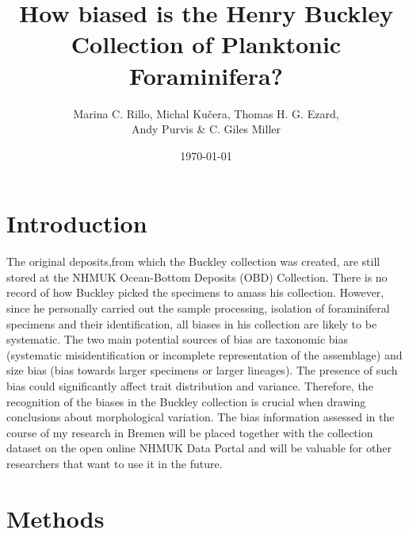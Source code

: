 \documentclass[a4paper]{article}
\title{How biased is the Henry Buckley Collection of Planktonic Foraminifera?}
\author{Marina C. Rillo, Michal Kučera, Thomas H. G. Ezard, \\ Andy Purvis \& C. Giles Miller}
\date{\today}
\begin{document}
\maketitle




\section{Introduction}
\label{sec:introduction}

The original deposits,from which the Buckley collection was created, are still stored at the NHMUK Ocean-Bottom Deposits (OBD) Collection. 
There is no record of how Buckley picked the specimens to amass his collection. However, since he personally carried out the sample processing, isolation of foraminiferal specimens and their identification, all biases in his collection are likely to be systematic. The two main potential sources of bias are taxonomic bias (systematic misidentification or incomplete representation of the assemblage) and size bias (bias towards larger specimens or larger lineages). The presence of such bias could significantly affect trait distribution and variance. Therefore, the recognition of the biases in the Buckley collection is crucial when drawing conclusions about morphological variation. The bias information assessed in the course of my research in Bremen will be placed together with the collection dataset on the open online NHMUK Data Portal and will be valuable for other researchers that want to use it in the future.




\section{Methods}
\label{sec:methods}
\end{document}

